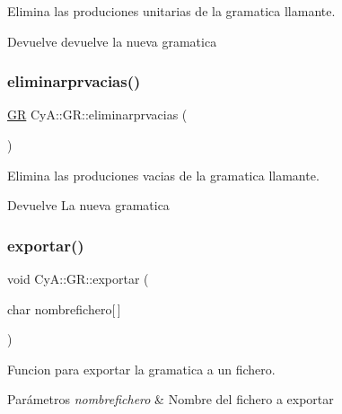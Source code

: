 Elimina las produciones unitarias de la gramatica llamante. 

\begin{DoxyReturn}{Devuelve}
devuelve la nueva gramatica 
\end{DoxyReturn}
\mbox{\label{class_cy_a_1_1_g_r_acb16878bc707d77126a28f92a2355619}} 
\subsubsection{\texorpdfstring{eliminarprvacias()}{eliminarprvacias()}}
{\footnotesize\ttfamily \mbox{\hyperlink{class_cy_a_1_1_g_r}{GR}} Cy\+A\+::\+G\+R\+::eliminarprvacias (\begin{DoxyParamCaption}{ }\end{DoxyParamCaption})}



Elimina las produciones vacias de la gramatica llamante. 

\begin{DoxyReturn}{Devuelve}
La nueva gramatica 
\end{DoxyReturn}
\mbox{\label{class_cy_a_1_1_g_r_a23ae98bf2b0df0b588bc84d7d645891f}} 
\subsubsection{\texorpdfstring{exportar()}{exportar()}}
{\footnotesize\ttfamily void Cy\+A\+::\+G\+R\+::exportar (\begin{DoxyParamCaption}\item[{char}]{nombrefichero\mbox{[}$\,$\mbox{]} }\end{DoxyParamCaption})}



Funcion para exportar la gramatica a un fichero. 


\begin{DoxyParams}{Parámetros}
{\em nombrefichero} & Nombre del fichero a exportar \\
\hline
\end{DoxyParams}
\mbox{\label{class_cy_a_1_1_g_r_abed49d1b06c6007e69c2afc55c931ada}} 
